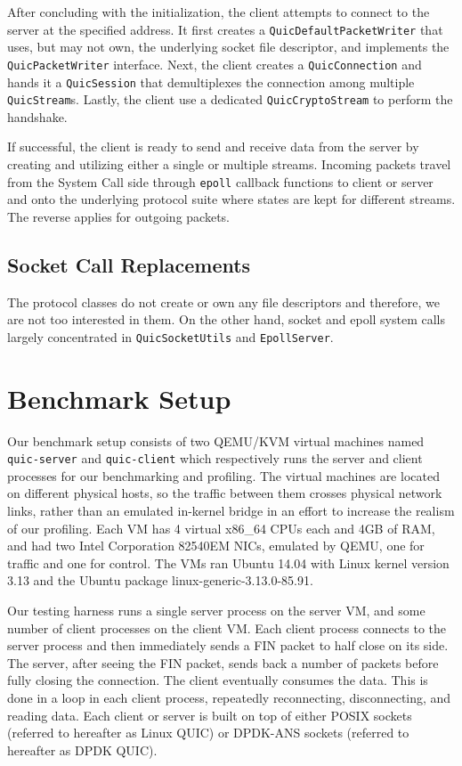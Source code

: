 \documentclass{sig-alternate-05-2015}
\begin{document}
After concluding with the initialization, the client attempts to connect to the server at the specified address. It first creates a                   \texttt{QuicDefaultPacketWriter} that uses, but may not own, the underlying socket file descriptor, and implements the \texttt{QuicPacketWriter} interface. Next, the client creates a \texttt{QuicConnection} and hands it a \texttt{QuicSession} that demultiplexes the connection among multiple \texttt{QuicStream}s. Lastly, the client use a dedicated \texttt{QuicCryptoStream} to perform the handshake.

If successful, the client is ready to send and receive data from the server by creating and utilizing either a single or multiple streams. Incoming packets travel from the System Call side through \texttt{epoll} callback functions to client or server and onto the underlying protocol suite where states are kept for different streams. The reverse applies for outgoing packets.

\subsection{Socket Call Replacements}
The protocol classes do not create or own any file descriptors and therefore, we are not too interested in them. On the other hand, socket and epoll system calls largely concentrated in \texttt{QuicSocketUtils} and \texttt{EpollServer}. 


\section{Benchmark Setup}
Our benchmark setup consists of two QEMU/KVM virtual machines named
\texttt{quic-server} and \texttt{quic-client} which respectively runs the server and client processes for our benchmarking and profiling.
The virtual machines are located on different physical hosts,
so the traffic between them crosses physical network links, rather than an emulated in-kernel bridge in an effort to increase the realism of our profiling. Each VM has 4 virtual x86\_64 CPUs each and 4GB of RAM,
and had two Intel Corporation 82540EM NICs, emulated by QEMU, one for traffic and one for control. The VMs ran Ubuntu 14.04 with Linux kernel version 3.13 and the Ubuntu package linux-generic-3.13.0-85.91.

Our testing harness runs a single server process on the server VM,
and some number of client processes on the client VM. Each client process connects to the server process and then immediately sends a FIN packet to half close on its side. The server, after seeing the FIN packet, sends back a number of packets before fully closing the connection. The client eventually consumes the data. This is done in a loop in each client process, repeatedly reconnecting, disconnecting, and reading data. Each client or server is built on top of either POSIX sockets (referred to hereafter as Linux QUIC) or DPDK-ANS sockets (referred to hereafter as DPDK QUIC). 
\end{document}
